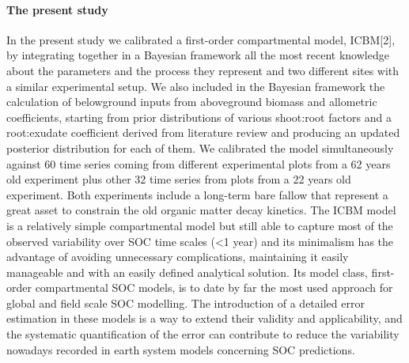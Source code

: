 \documentclass[review]{elsarticle}
\begin{document}
\paragraph{The present study} In the present study we calibrated a first-order compartmental model, ICBM[2], by integrating together in a Bayesian framework all the most recent knowledge about the parameters and the process they represent and two different sites with a similar experimental setup. We also included in the Bayesian framework the calculation of belowground inputs from aboveground biomass and allometric coefficients, starting from prior distributions of various shoot:root factors and a root:exudate coefficient derived from literature review and producing an updated posterior distribution for each of them. We calibrated the model simultaneously against 60 time series coming from different experimental plots from a 62 years old experiment plus other 32 time series from plots from a 22 years old experiment. Both experiments include a long-term bare fallow that represent a great asset to constrain the old organic matter decay kinetics.
The ICBM model is a relatively simple compartmental model but still able to capture most of the observed variability over SOC time scales (<1 year) and its minimalism has the advantage of avoiding unnecessary complications, maintaining it easily manageable and with an easily defined analytical solution. Its model class, first-order compartmental SOC models, is to date by far the most used approach for global and field scale SOC modelling. The introduction of a detailed error estimation in these models is a way to extend their validity and applicability, and the systematic quantification of the error can contribute to reduce the variability nowadays recorded in earth system models concerning SOC predictions.
\end{document}
